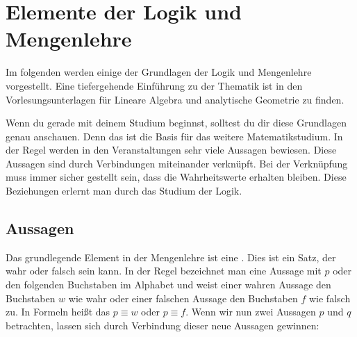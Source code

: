 \documentclass[ngerman,titlepage,twoside, parskip=half*]{scrreprt}
\theoremstyle{plain}
\theoremstyle{definition}
\theoremstyle{remark}
\newcommand*{\highl}[2][]{\textbf{\boldmath{#2}}%
  \ifthenelse{\equal{#1}{}}{\index{#2}}{\index{#1}}%
}
\begin{document}
\chapter{Elemente der Logik und Mengenlehre}

Im folgenden werden einige der Grundlagen der Logik und Mengenlehre
vorgestellt. Eine tiefergehende Einführung zu der Thematik ist in den
Vorlesungsunterlagen für Lineare Algebra und analytische Geometrie zu finden.

Wenn du gerade mit deinem Studium beginnst, solltest du dir diese Grundlagen
genau anschauen. Denn das ist die Basis für das weitere Matematikstudium. In
der Regel werden in den Veranstaltungen sehr viele Aussagen bewiesen. Diese
Aussagen sind durch Verbindungen miteinander verknüpft. Bei der Verknüpfung
muss immer sicher gestellt sein, dass die Wahrheitswerte erhalten bleiben.
Diese Beziehungen erlernt man durch das Studium der Logik.

\section{Aussagen}

Das grundlegende Element in der Mengenlehre ist eine
\highl{Aussage}. Dies ist ein Satz, der wahr oder falsch sein kann. In
der Regel bezeichnet man eine Aussage mit $p$ oder den folgenden
Buchstaben im Alphabet und weist einer wahren Aussage den Buchstaben
$w$ wie wahr oder einer falschen Aussage den Buchstaben $f$ wie falsch
zu. In Formeln heißt das $p\equiv w$ oder $p\equiv f$. Wenn wir nun
zwei Aussagen $p$ und $q$ betrachten, lassen sich durch Verbindung
dieser neue Aussagen gewinnen:
\end{document}
